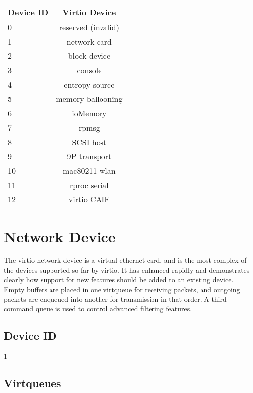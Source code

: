 \begin{tabular} { |l|c| }
\hline
Device ID  &  Virtio Device    \\
\hline \hline
0          & reserved (invalid) \\
\hline
1          &   network card     \\
\hline
2          &   block device     \\
\hline
3          &      console       \\
\hline
4          &  entropy source    \\
\hline
5          & memory ballooning  \\
\hline
6          &     ioMemory       \\
\hline
7          &       rpmsg        \\
\hline
8          &     SCSI host      \\
\hline
9          &   9P transport     \\
\hline
10         &   mac80211 wlan    \\
\hline
11         &   rproc serial     \\
\hline
12         &   virtio CAIF      \\
\hline
\end{tabular}

\section{Network Device}\label{sec:Device Types / Network Device}

The virtio network device is a virtual ethernet card, and is the
most complex of the devices supported so far by virtio. It has
enhanced rapidly and demonstrates clearly how support for new
features should be added to an existing device. Empty buffers are
placed in one virtqueue for receiving packets, and outgoing
packets are enqueued into another for transmission in that order.
A third command queue is used to control advanced filtering
features.

\subsection{Device ID}\label{sec:Device Types / Network Device / Device ID}

 1

\subsection{Virtqueues}\label{sec:Device Types / Network Device / Virtqueues}

